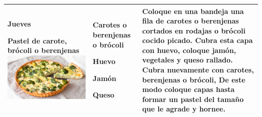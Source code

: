 \documentclass[menu.tex]{subfiles}
\begin{document}
\begin{tabular} {p{3.5cm} p{4cm} p{9cm}}
        \pbox{20cm}
        {
            \rule{0pt}{3ex}\begin{large}\textbf{Jueves}\end{large}\\
            \rule{0pt}{2ex}Pastel de carote,\\ brócoli o berenjenas\\
            \includegraphics[scale=0.42]{pastel-brocoli}
        } & 
        \vspace{-1.6cm}
        \begin{compactitem} 
            \begin{footnotesize}
                \item Carotes o berenjenas o brócoli
                \item Huevo
                \item Jamón
                \item Queso
            \end{footnotesize}
        \end{compactitem}&
        \vspace{-1.6cm}
        Coloque en una bandeja una fila de carotes o berenjenas cortados en rodajas o brócoli cocido picado. Cubra esta capa con huevo, coloque jamón, vegetales y queso rallado. Cubra nuevamente con carotes, berenjenas o brócoli, De este modo coloque capas hasta formar un pastel del tamaño que le agrade y hornee.\\
        \hline
        

\end{tabular}
\end{document}
